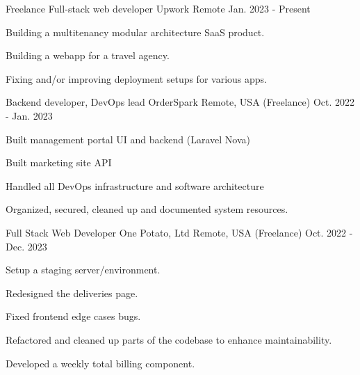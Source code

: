 

\begin{cventries}
  \cventry
    {Freelance Full-stack web developer} %
    {Upwork} %
    {Remote} %
    {Jan. 2023 - Present} %
    {
      \begin{cvitems} %
        \item {Building a multitenancy modular architecture SaaS product.}
        \item {Building a webapp for a travel agency.}
        \item {Fixing and/or improving deployment setups for various apps.}
      \end{cvitems}
    }

  \cventry
    {Backend developer, DevOps lead} %
    {OrderSpark} %
    {Remote, USA (Freelance)} %
    {Oct. 2022 - Jan. 2023} %
    {
      \begin{cvitems} %
        \item {Built management portal UI and backend (Laravel Nova)}
        \item {Built marketing site API}
        \item {Handled all DevOps infrastructure and software architecture}
        \item {Organized, secured, cleaned up and documented system resources.}
      \end{cvitems}
    }

  \cventry
    {Full Stack Web Developer} %
    {One Potato, Ltd} %
    {Remote, USA (Freelance)} %
    {Oct. 2022 - Dec. 2023} %
    {
      \begin{cvitems} %
        \item {Setup a staging server/environment.}
        \item {Redesigned the deliveries page.}
        \item {Fixed frontend edge cases bugs.}
        \item {Refactored and cleaned up parts of the codebase to enhance maintainability.}
        \item {Developed a weekly total billing component.}
      \end{cvitems}
    }


\end{cventries}
